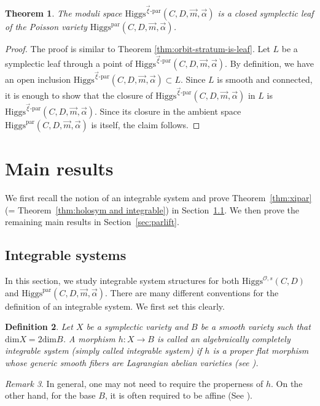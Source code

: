 \documentclass[11pt]{amsart}
\theoremstyle{plain}
\newtheorem{theorem}{Theorem}[section]
\newtheorem{definition}[theorem]{Definition}
\theoremstyle{definition}
\theoremstyle{remark}
\newtheorem{remark}[theorem]{Remark}
\newcommand{\cO}{\mathcal O}
\newcommand{\Higgs}{\mathrm{Higgs}}
\def\a{\alpha}
\def\dim{\mathrm{dim}}
\def\vxi{\vec{\xi}}
\def\vm{\vec{m}}
\def\va{\vec{\a}}
\begin{document}
\begin{theorem}\label{thm:symplectic leaf xipar}
    The moduli space $\Higgs^{\vxi\text{-par}}(C,D,\vm,\va)$ is a closed symplectic leaf of the Poisson variety $\Higgs^{\text{par}}(C,D,\vm,\va)$. 
\end{theorem}
\begin{proof}
    The proof is similar to Theorem \ref{thm:orbit-stratum-is-leaf}.
    Let $L$ be a symplectic leaf through a point of $\Higgs^{\vxi\text{-par}}(C,D,\vm,\va)$. By definition, we have an open inclusion $\Higgs^{\vxi\text{-par}}(C,D,\vm,\va) \subset L$. Since $L$ is smooth and connected, it is enough to show that the closure of $\Higgs^{\vxi\text{-par}}(C,D,\vm,\va)$ in $L$ is $\Higgs^{\vxi\text{-par}}(C,D,\vm,\va)$. Since its closure in the ambient space $\Higgs^{\text{par}}(C,D,\vm,\va)$ is itself, the claim follows. 
\end{proof}


\section{Main results}
We first recall the notion of an integrable system and prove
Theorem~\ref{thm:xipar} (= Theorem~\ref{thm:holosym and integrable}) in
Section~\ref{sec:integrable systems}. We then prove the remaining main results
in Section~\ref{sec:parlift}.
\subsection{Integrable systems}\label{sec:integrable systems}
In this section, we study integrable system structures for both $\Higgs^{\cO,s}(C,D)$ and $\Higgs^{\text{par}}(C,D,\vm,\va)$. There are many different conventions for the definition of an integrable system. We first set this clearly. 


\begin{definition}\label{def:integrable system}
    Let $X$ be a symplectic variety and $B$ be a smooth variety such that $\dim X=2\dim B$.  A morphism $h:X \to B$ is called an algebraically completely integrable system (simply called integrable system) if $h$ is a proper flat morphism whose generic smooth fibers are Lagrangian abelian varieties (see \cite[Definition 2.9]{DonagiMarkman1996}). 
\end{definition}
 

\begin{remark}
   In general, one may not need to require the properness of $h$. On the other hand, for the base $B$, it is often required to be affine (See \cite[Definition 1]{boalch2018wild}).
\end{remark}
\end{document}
